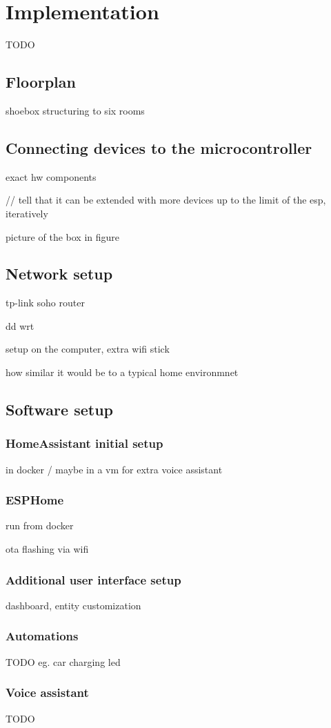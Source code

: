 \chapter{Implementation}
TODO

\section{Floorplan}
shoebox structuring to six rooms

\section{Connecting devices to the microcontroller}
exact hw components

// tell that it can be extended with more devices up to the limit of the esp, iteratively

picture of the box in figure

\section{Network setup}
tp-link soho router

dd wrt

setup on the computer, extra wifi stick

how similar it would be to a typical home environmnet
\section{Software setup}
\subsection{HomeAssistant initial setup}
in docker / maybe in a vm for extra voice assistant

\subsection{ESPHome}
run from docker

ota flashing via wifi
\subsection{Additional user interface setup}
dashboard, entity customization

\subsection{Automations}
TODO eg. car charging led

\subsection{Voice assistant}
TODO
